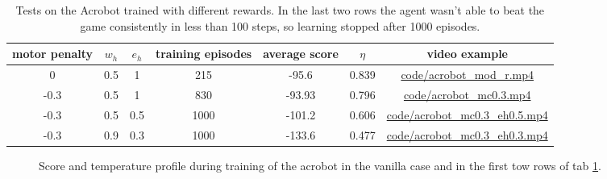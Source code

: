\documentclass[a4paper, 11pt]{article}
\begin{document}
  \begin{table}[H]
    \centering
    \begin{tabular}{ccc|ccc|c}
      \toprule
      motor penalty & $w_h$ & $e_h$ & training episodes & average score & $\eta$ & video example \\
      \midrule
      0 & 0.5 & 1 & 215 & -95.6 & 0.839 & \url{code/acrobot_mod_r.mp4} \\
      -0.3 & 0.5 & 1 & 830 & -93.93 & 0.796 & \url{code/acrobot_mc0.3.mp4} \\
      -0.3 & 0.5 & 0.5 & 1000 & -101.2 & 0.606 & \url{code/acrobot_mc0.3_eh0.5.mp4} \\
      -0.3 & 0.9 & 0.3 & 1000 & -133.6 & 0.477 & \url{code/acrobot_mc0.3_eh0.3.mp4}
    \end{tabular}
    \caption{Tests on the Acrobot trained with different rewards. In the last two rows the agent wasn't able to beat the game consistently in less than 100 steps, so learning stopped after 1000 episodes.}
    \label{tab:acrobot}
  \end{table}

  \begin{figure}
    \centering
     \quad
     \quad
    \caption{Score and temperature profile during training of the acrobot in the vanilla case and in the first tow rows of tab \ref{tab:acrobot}.}
    \label{fig:acrobot}
  \end{figure}
\end{document}
